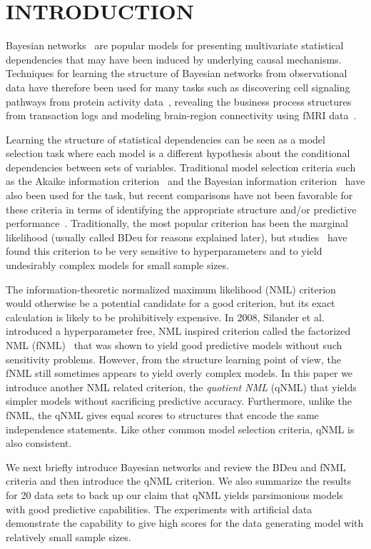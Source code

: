 \section{INTRODUCTION}
\label{sec:intro}
Bayesian networks~\cite{Pear88} are popular models for presenting
multivariate statistical dependencies that may have been induced by
underlying causal mechanisms.  Techniques for learning the structure
of Bayesian networks from observational data have therefore been used
for many tasks such as discovering cell signaling pathways from
protein activity data~\cite{bn4sigpath02}, revealing the business
process structures~\cite{bn4bpmining} from transaction logs and
modeling brain-region connectivity using fMRI
data~\cite{bn4brainconnect}.

Learning the structure of statistical dependencies can be seen as a
model selection task where each model is a different hypothesis about
the conditional dependencies between sets of variables. Traditional
model selection criteria such as the Akaike information
criterion~\cite{Akai73} and the Bayesian information
criterion~\cite{Schw78} have also been used for the task, but recent
comparisons have not been favorable for these criteria in terms of
identifying the appropriate structure and/or predictive
performance~\cite{cosco.pgm08a}. Traditionally, the most popular
criterion has been the marginal likelihood (usually called BDeu for
reasons explained later), but studies~\cite{cosco.uai07,Steck08}
have found this criterion to be very sensitive to hyperparameters
and to yield undesirably complex models for small sample sizes.

The information-theoretic normalized maximum likelihood (NML)
criterion~\cite{Shta87,Riss96a} would otherwise be a potential candidate
for a good criterion, but its exact calculation is likely to be
prohibitively expensive. In 2008, Silander et al. introduced a
hyperparameter free, NML inspired criterion called the factorized NML
(fNML)~\cite{cosco.pgm08a} that was shown to yield good predictive
models without such sensitivity problems. However, from the structure
learning point of view, the fNML still sometimes appears to yield
overly complex models. In this paper we introduce another NML related
criterion, the \textit{quotient NML} (qNML) that yields simpler models
without sacrificing predictive accuracy. Furthermore, unlike the fNML,
the qNML gives equal scores to structures that encode the same
independence statements. Like other common model selection criteria,
qNML is also consistent.

We next briefly introduce Bayesian networks and review the BDeu and
fNML criteria and then introduce the qNML criterion.  We also
summarize the results for 20 data sets to back up our claim that qNML
yields parsimonious models with good predictive capabilities. The
experiments with artificial data demonstrate the capability to give
high scores for the data generating model with relatively small sample
sizes.

